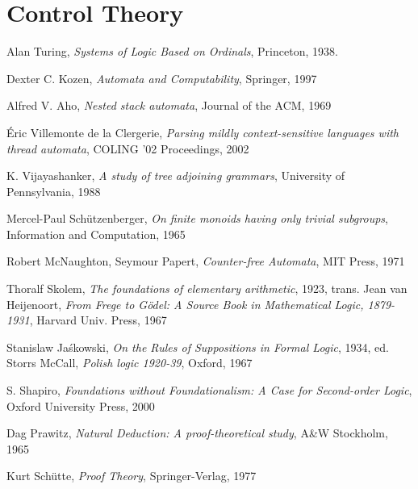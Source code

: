 \documentclass{article}
\begin{document}
\part{Control Theory}\label{sec:control_theory}

\begin{thebibliography}{99}

    Alan Turing,
    \emph{Systems of Logic Based on Ordinals},
    Princeton,
    1938.

    Dexter C. Kozen,
    \emph{Automata and Computability},
    Springer,
    1997

    Alfred V. Aho,
    \emph{Nested stack automata},
    Journal of the ACM,
    1969

    \'Eric Villemonte de la Clergerie,
    \emph{Parsing mildly context-sensitive languages with thread automata},
    COLING '02 Proceedings,
    2002

    K. Vijayashanker,
    \emph{A study of tree adjoining grammars},
    University of Pennsylvania,
    1988

    Mercel-Paul Sch\"utzenberger,
    \emph{On finite monoids having only trivial subgroups},
    Information and Computation,
    1965

    Robert McNaughton, Seymour Papert,
    \emph{Counter-free Automata},
    MIT Press,
    1971

    Thoralf Skolem,
    \emph{The foundations of elementary arithmetic},
    1923,
    trans. Jean van Heijenoort,
    \emph{From Frege to G\"odel: A Source Book in Mathematical Logic, 1879-1931},
    Harvard Univ. Press,
    1967

    Stanislaw Ja\'skowski,
    \emph{On the Rules of Suppositions in Formal Logic},
    1934,
    ed. Storrs McCall,
    \emph{Polish logic 1920-39},
    Oxford,
    1967

    S. Shapiro,
    \emph{Foundations without Foundationalism: A Case for Second-order
    Logic},
    Oxford University Press,
    2000

    Dag Prawitz,
    \emph{Natural Deduction: A proof-theoretical study},
    A\&W Stockholm,
    1965

    Kurt Sch\"utte,
    \emph{Proof Theory},
    Springer-Verlag,
    1977


\end{thebibliography}
\end{document}
